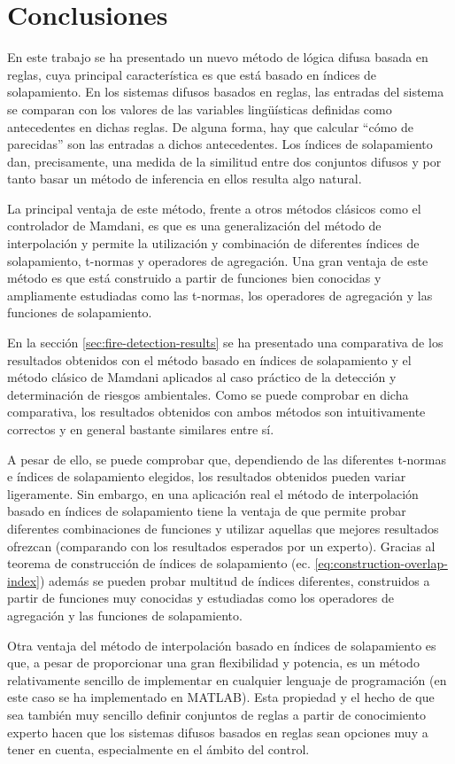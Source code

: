 \chapter{Conclusiones}
En este trabajo se ha presentado un nuevo método de lógica difusa basada en reglas, cuya principal característica es que está basado en índices de solapamiento. En los sistemas difusos basados en reglas, las entradas del sistema se comparan con los valores de las variables lingüísticas definidas como antecedentes en dichas reglas. De alguna forma, hay que calcular ``cómo de parecidas'' son las entradas a dichos antecedentes. Los índices de solapamiento dan, precisamente, una medida de la similitud entre dos conjuntos difusos y por tanto basar un método de inferencia en ellos resulta algo natural.

La principal ventaja de este método, frente a otros métodos clásicos como el controlador de Mamdani, es que es una generalización del método de interpolación y permite la utilización y combinación de diferentes índices de solapamiento, t-normas y operadores de agregación. Una gran ventaja de este método es que está construido a partir de funciones bien conocidas y ampliamente estudiadas como las t-normas, los operadores de agregación y las funciones de solapamiento.

En la sección \ref{sec:fire-detection-results} se ha presentado una comparativa de los resultados obtenidos con el método basado en índices de solapamiento y el método clásico de Mamdani aplicados al caso práctico de la detección y determinación de riesgos ambientales. Como se puede comprobar en dicha comparativa, los resultados obtenidos con ambos métodos son intuitivamente correctos y en general bastante similares entre sí. 

A pesar de ello, se puede comprobar que, dependiendo de las diferentes t-normas e índices de solapamiento elegidos, los resultados obtenidos pueden variar ligeramente. Sin embargo, en una aplicación real el método de interpolación basado en índices de solapamiento tiene la ventaja de que permite probar diferentes combinaciones de funciones y utilizar aquellas que mejores resultados ofrezcan (comparando con los resultados esperados por un experto). Gracias al teorema de construcción de índices de solapamiento (ec. \ref{eq:construction-overlap-index}) además se pueden probar multitud de índices diferentes, construidos a partir de funciones muy conocidas y estudiadas como los operadores de agregación y las funciones de solapamiento.

Otra ventaja del método de interpolación basado en índices de solapamiento es que, a pesar de proporcionar una gran flexibilidad y potencia, es un método relativamente sencillo de implementar en cualquier lenguaje de programación (en este caso se ha implementado en MATLAB). Esta propiedad y el hecho de que sea también muy sencillo definir conjuntos de reglas a partir de conocimiento experto hacen que los sistemas difusos basados en reglas sean opciones muy a tener en cuenta, especialmente en el ámbito del control.